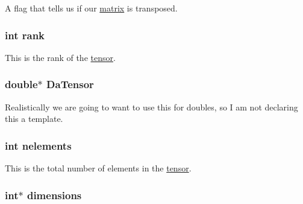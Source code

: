 A flag that tells us if our \hyperlink{classJKBuilder_1_1matrix}{matrix} is transposed. \hypertarget{classJKBuilder_1_1tensor_a6cfd95afd0afebd625b889fb6e58371c}{
\subsubsection[{rank}]{\setlength{\rightskip}{0pt plus 5cm}int {\bf rank}}}
\label{classJKBuilder_1_1tensor_a6cfd95afd0afebd625b889fb6e58371c}


This is the rank of the \hyperlink{classJKBuilder_1_1tensor}{tensor}. \hypertarget{classJKBuilder_1_1tensor_a91f7b1e58c0e5d1a49ddb8b80ab7790e}{
\subsubsection[{DaTensor}]{\setlength{\rightskip}{0pt plus 5cm}double$\ast$ {\bf DaTensor}}}
\label{classJKBuilder_1_1tensor_a91f7b1e58c0e5d1a49ddb8b80ab7790e}


Realistically we are going to want to use this for doubles, so I am not declaring this a template. \hypertarget{classJKBuilder_1_1tensor_a23ae6a00bed19d2ad34d439636e797da}{
\subsubsection[{nelements}]{\setlength{\rightskip}{0pt plus 5cm}int {\bf nelements}}}
\label{classJKBuilder_1_1tensor_a23ae6a00bed19d2ad34d439636e797da}


This is the total number of elements in the \hyperlink{classJKBuilder_1_1tensor}{tensor}. \hypertarget{classJKBuilder_1_1tensor_a2ce1e6e0782ddee097f2c4aa2663d3e9}{
\subsubsection[{dimensions}]{\setlength{\rightskip}{0pt plus 5cm}int$\ast$ {\bf dimensions}}}
\label{classJKBuilder_1_1tensor_a2ce1e6e0782ddee097f2c4aa2663d3e9}


